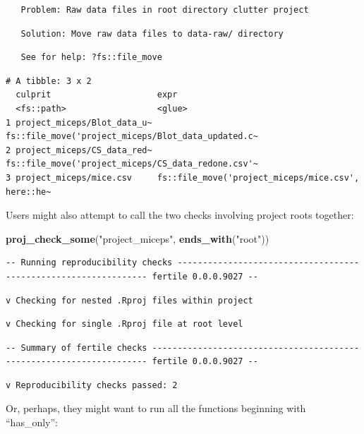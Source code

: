 \documentclass[12pt,twoside]{reedthesis}
\newenvironment{Shaded}{\begin{snugshade}}{\end{snugshade}}
\newcommand{\KeywordTok}[1]{\textcolor[rgb]{0.13,0.29,0.53}{\textbf{#1}}}
\newcommand{\StringTok}[1]{\textcolor[rgb]{0.31,0.60,0.02}{#1}}
\newcommand{\NormalTok}[1]{#1}
\begin{document}
\begin{verbatim}
   Problem: Raw data files in root directory clutter project
\end{verbatim}
\begin{verbatim}
   Solution: Move raw data files to data-raw/ directory
\end{verbatim}
\begin{verbatim}
   See for help: ?fs::file_move
\end{verbatim}
\begin{verbatim}
# A tibble: 3 x 2
  culprit                     expr                                              
  <fs::path>                  <glue>                                            
1 project_miceps/Blot_data_u~ fs::file_move('project_miceps/Blot_data_updated.c~
2 project_miceps/CS_data_red~ fs::file_move('project_miceps/CS_data_redone.csv'~
3 project_miceps/mice.csv     fs::file_move('project_miceps/mice.csv', here::he~
\end{verbatim}
\normalsize

Users might also attempt to call the two checks involving project roots
together:

\footnotesize
\begin{Shaded}
\begin{Highlighting}[]
\KeywordTok{proj_check_some}\NormalTok{(}\StringTok{"project_miceps"}\NormalTok{, }\KeywordTok{ends_with}\NormalTok{(}\StringTok{"root"}\NormalTok{))}
\end{Highlighting}
\end{Shaded}
\begin{verbatim}
-- Running reproducibility checks ---------------------------------------------------------------- fertile 0.0.0.9027 --
\end{verbatim}
\begin{verbatim}
v Checking for nested .Rproj files within project
\end{verbatim}
\begin{verbatim}
v Checking for single .Rproj file at root level
\end{verbatim}
\begin{verbatim}
-- Summary of fertile checks --------------------------------------------------------------------- fertile 0.0.0.9027 --
\end{verbatim}
\begin{verbatim}
v Reproducibility checks passed: 2
\end{verbatim}
\normalsize

Or, perhaps, they might want to run all the functions beginning with
``has\_only'':
\end{document}
